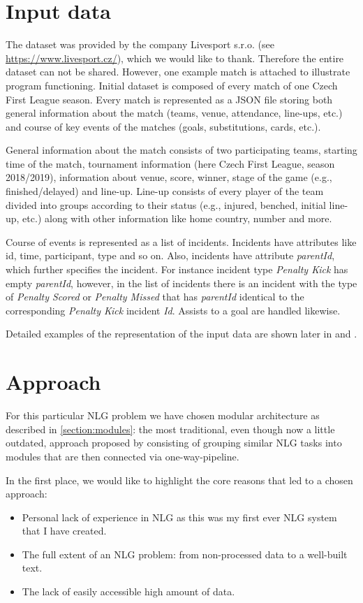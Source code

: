 \section{Input data}
The dataset was provided by the company Livesport s.r.o. (see \url{https://www.livesport.cz/}), which we would like to thank. Therefore the entire dataset can not be shared. However, one example match is attached to illustrate program functioning. Initial dataset is composed of every match of one Czech First League season. Every match is represented as a JSON file storing both general information about the match (teams, venue, attendance, line-ups, etc.) and course of key events of the matches (goals, substitutions, cards, etc.). 

General information about the match consists of two participating teams, starting time of the match, tournament information (here Czech First League, season 2018/2019), information about venue, score, winner, stage of the game (e.g., finished/delayed) and line-up. Line-up consists of every player of the team divided into groups according to their status (e.g., injured, benched, initial line-up, etc.) along with other information like home country, number and more. 

Course of events is represented as a list of incidents. Incidents have attributes like id, time, participant, type and so on. Also, incidents have attribute \emph{parentId}, which further specifies the incident. For instance incident type \emph{Penalty Kick} has empty \emph{parentId}, however, in the list of incidents there is an incident with the type of \emph{Penalty Scored} or \emph{Penalty Missed} that has \emph{parentId} identical to the corresponding \emph{Penalty Kick} incident \emph{Id}. Assists to a goal are handled likewise.

Detailed examples of the representation of the input data are shown later in  and .

\section{Approach}

For this particular NLG problem we have chosen modular architecture as described in \ref{section:modules}: the most traditional, even though now a little outdated, approach proposed by \cite {reiter1997building} consisting of grouping similar NLG tasks into modules that are then connected via one-way-pipeline. 

In the first place, we would like to highlight the core reasons that led to a chosen approach:
\begin{itemize}
	\item Personal lack of experience in NLG as this was my first ever NLG system that I have created.
	\item The full extent of an NLG problem: from non-processed data to a  well-built text.   
	\item The lack of easily accessible high amount of data.
\end{itemize}

